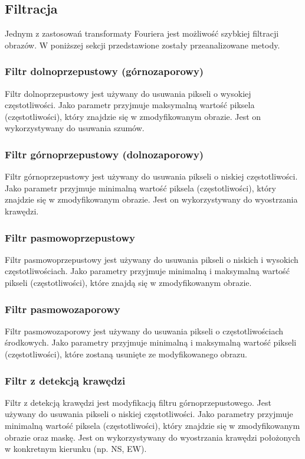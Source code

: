 \documentclass{classrep}
\begin{document}
\subsection{Filtracja}
Jednym z zastosowań transformaty Fouriera jest możliwość szybkiej filtracji obrazów. W poniższej sekcji przedstawione zostały przeanalizowane metody.

\subsubsection{Filtr dolnoprzepustowy (górnozaporowy)}
Filtr dolnoprzepustowy jest używany do usuwania pikseli o wysokiej częstotliwości. Jako parametr przyjmuje maksymalną wartość piksela (częstotliwości), który znajdzie się w zmodyfikowanym obrazie. Jest on wykorzystywany do usuwania szumów.

\subsubsection{Filtr górnoprzepustowy (dolnozaporowy)}
Filtr górnoprzepustowy jest używany do usuwania pikseli o niskiej częstotliwości. Jako parametr przyjmuje minimalną wartość piksela (częstotliwości), który znajdzie się w zmodyfikowanym obrazie. Jest on wykorzystywany do wyostrzania krawędzi.

\subsubsection{Filtr pasmowoprzepustowy}
Filtr pasmowoprzepustowy jest używany do usuwania pikseli o niskich i wysokich częstotliwościach. Jako parametry przyjmuje minimalną i maksymalną wartość pikseli (częstotliwości), które znajdą się w zmodyfikowanym obrazie.

\subsubsection{Filtr pasmowozaporowy}
Filtr pasmowozaporowy jest używany do usuwania pikseli o częstotliwościach środkowych. Jako parametry przyjmuje minimalną i maksymalną wartość pikseli (częstotliwości), które zostaną usunięte ze modyfikowanego obrazu.

\subsubsection{Filtr z detekcją krawędzi}
Filtr z detekcją krawędzi jest modyfikacją filtru górnoprzepustowego. Jest używany do usuwania pikseli o niskiej częstotliwości. Jako parametry przyjmuje minimalną wartość piksela (częstotliwości), który znajdzie się w zmodyfikowanym obrazie oraz maskę. Jest on wykorzystywany do wyostrzania krawędzi położonych w konkretnym kierunku (np. NS, EW).
\end{document}
